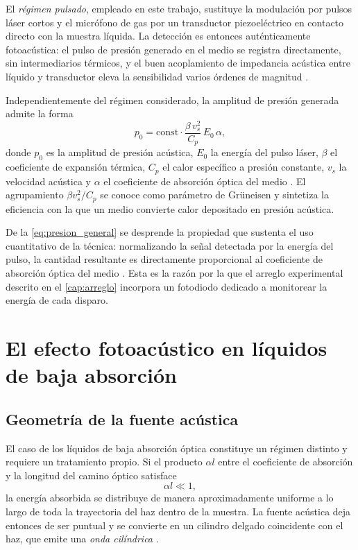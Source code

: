 El \textit{régimen pulsado}, empleado en este trabajo, sustituye la
modulación por pulsos láser cortos y el micrófono de gas por un
transductor piezoeléctrico en contacto directo con la muestra
líquida. La detección es entonces auténticamente fotoacústica: el
pulso de presión generado en el medio se registra directamente, sin
intermediarios térmicos, y el buen acoplamiento de impedancia
acústica entre líquido y transductor eleva la sensibilidad varios
órdenes de magnitud \cite{PatelTam1981}.

Independientemente del régimen considerado, la amplitud de presión
generada admite la forma
\begin{equation}
    p_0 = \text{const} \cdot \frac{\beta\, v_s^2}{C_p}\, E_0\, \alpha,
    \label{eq:presion_general}
\end{equation}
donde $p_0$ es la amplitud de presión acústica, $E_0$ la energía del
pulso láser, $\beta$ el coeficiente de expansión térmica, $C_p$ el
calor específico a presión constante, $v_s$ la velocidad acústica y
$\alpha$ el coeficiente de absorción óptica del medio
\cite{PatelTam1981}. El agrupamiento $\beta v_s^2 / C_p$ se conoce
como parámetro de Grüneisen y sintetiza la eficiencia con la que un
medio convierte calor depositado en presión acústica.

De la \cref{eq:presion_general} se desprende la propiedad que
sustenta el uso cuantitativo de la técnica: normalizando la señal
detectada por la energía del pulso, la cantidad resultante es
directamente proporcional al coeficiente de absorción óptica del
medio \cite{PatelTam1981}. Esta es la razón por la que el arreglo
experimental descrito en el \cref{cap:arreglo} incorpora un
fotodiodo dedicado a monitorear la energía de cada disparo.

\section{El efecto fotoacústico en líquidos de baja absorción}
\label{sec:fotoacustico_liquidos}

\subsection*{Geometría de la fuente acústica}

El caso de los líquidos de baja absorción óptica constituye un
régimen distinto y requiere un tratamiento propio. Si el producto
$\alpha l$ entre el coeficiente de absorción y la longitud del
camino óptico satisface
\begin{equation}
    \alpha l \ll 1,
    \label{eq:condicion_debil}
\end{equation}
la energía absorbida se distribuye de manera aproximadamente
uniforme a lo largo de toda la trayectoria del haz dentro de la
muestra. La fuente acústica deja entonces de ser puntual y se
convierte en un cilindro delgado coincidente con el haz, que emite
una \textit{onda cilíndrica} \cite{PatelTam1981}.

